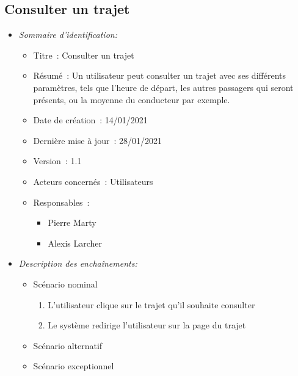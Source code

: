 \subsection{Consulter un trajet}\label{subsec:consulter-un-trajet}

\begin{itemize}

\item \textit{Sommaire d'identification:}

\begin{itemize}

\item Titre~: Consulter un trajet

\item Résumé~: Un utilisateur peut consulter un trajet avec ses différents paramètres, tels que l'heure de départ, les autres passagers qui seront présents, ou la moyenne du conducteur par exemple.

\item Date de création~: 14/01/2021

\item Dernière mise à jour~: 28/01/2021

\item Version~: 1.1

\item Acteurs concernés~: Utilisateurs

\item Responsables~:
\begin{itemize}
            \item Pierre Marty
            \item Alexis Larcher
        \end{itemize}

\end{itemize}

\item \textit{Description des enchaînements:}

\begin{itemize}
    \item Scénario nominal
    \begin{enumerate}
        \item L'utilisateur clique sur le trajet qu'il souhaite consulter
        \item Le système redirige l'utilisateur sur la page du trajet
    \end{enumerate}
    \item Scénario alternatif
    \item Scénario exceptionnel
\end{itemize}


\end{itemize}

